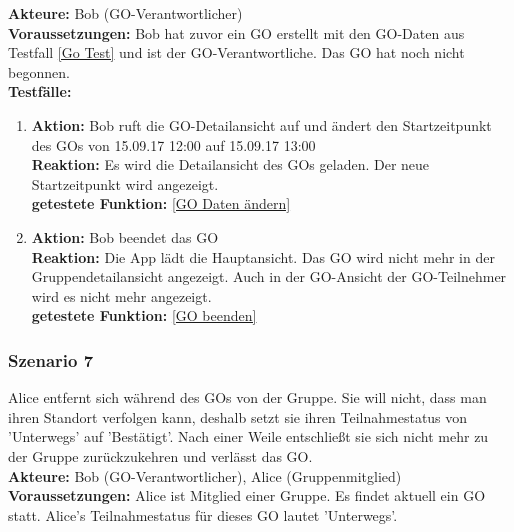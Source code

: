 \documentclass[parskip=full]{scrartcl}
\def\threedigits#1{%
  \ifnum#1<100 0\fi
  \ifnum#1<10 0\fi
  \number#1}
\begin{document}
\textbf{Akteure:} Bob (GO-Verantwortlicher)\\

\textbf{Voraussetzungen: }Bob hat zuvor ein GO erstellt mit den GO-Daten aus Testfall \ref{Go Test} und ist der GO-Verantwortliche. Das GO hat noch nicht begonnen.\\

\textbf{Testfälle:}
\begin{enumerate}[label={\textbf{/T\protect\threedigits{\theenumi}0/}}, leftmargin=*, resume]
	\item \textbf{Aktion:} Bob ruft die GO-Detailansicht auf und ändert den Startzeitpunkt des GOs von 15.09.17 12:00 auf 15.09.17 13:00\\
	\textbf{Reaktion:} Es wird die Detailansicht des GOs geladen. Der neue Startzeitpunkt wird angezeigt.\\
	\textbf{getestete Funktion:} \ref{GO Daten ändern}
	\item \textbf{Aktion:} Bob beendet das GO\\
	\textbf{Reaktion:} Die App lädt die Hauptansicht. Das GO wird nicht mehr in der Gruppendetailansicht angezeigt. Auch in der GO-Ansicht der GO-Teilnehmer wird es nicht mehr angezeigt.\\
	\textbf{getestete Funktion:} \ref{GO beenden}
\end{enumerate}

\subsubsection*{Szenario 7}Alice entfernt sich während des GOs von der Gruppe. Sie will nicht, dass man ihren Standort verfolgen kann, deshalb setzt sie ihren Teilnahmestatus von 'Unterwegs' auf 'Bestätigt'. Nach einer Weile entschließt sie sich nicht mehr zu der Gruppe zurückzukehren und verlässt das GO.\\

\textbf{Akteure:} Bob (GO-Verantwortlicher), Alice (Gruppenmitglied)\\

\textbf{Voraussetzungen: }Alice ist Mitglied einer Gruppe. Es findet aktuell ein GO statt. Alice's Teilnahmestatus für dieses GO lautet 'Unterwegs'.\\
\end{document}
